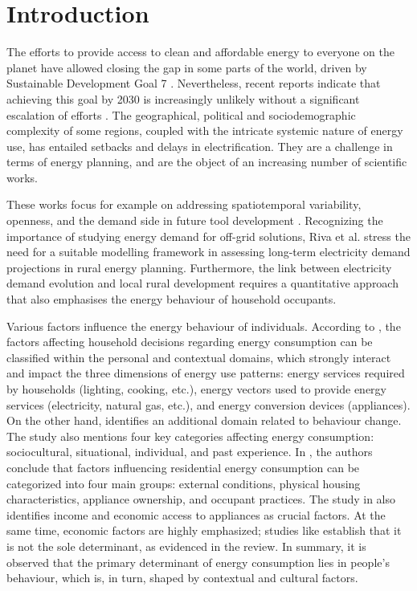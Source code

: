 \documentclass[final,3p,times,onecolumn]{elsarticle}
\begin{document}

\section{Introduction}
\label{sec:sample1}

The efforts to provide access to clean and affordable energy to everyone on the planet have allowed closing the gap in some parts of the world, driven by Sustainable Development Goal 7 \cite{un_news_centre_transforming_2015}. Nevertheless, recent reports indicate that achieving this goal by 2030 is increasingly unlikely without a significant escalation of efforts \cite{iea_irena_unsd_wb_who_tracking_2023}.  The geographical, political and sociodemographic complexity of some regions, coupled with the intricate systemic nature of energy use, has entailed setbacks and delays in electrification. They are a challenge in terms of energy planning, and are the object of an increasing number of scientific works.

These works focus for example on addressing spatiotemporal variability, openness, and the demand side in future tool development \cite{ringkjob_review_2018}. Recognizing the importance of studying energy demand for off-grid solutions, Riva et al. \cite{riva_modelling_nodate} stress the need for a suitable modelling framework in assessing long-term electricity demand projections in rural energy planning. Furthermore, the link between electricity demand evolution and local rural development requires a quantitative approach \cite{ringkjob_review_2018} that also emphasises the energy behaviour of household occupants\cite{zou_mixed_2018}. 
    
Various factors influence the energy behaviour of individuals. According to \cite{Kowsari2011}, the factors affecting household decisions regarding energy consumption can be classified within the personal and contextual domains, which strongly interact and impact the three dimensions of energy use patterns: energy services required by households (lighting, cooking, etc.), energy vectors used to provide energy services (electricity, natural gas, etc.), and energy conversion devices (appliances). On the other hand, \cite{medojevic_integrated_2021} identifies an additional domain related to behaviour change. The study also mentions four key categories affecting energy consumption: sociocultural, situational, individual, and past experience. In \cite{kavousian_determinants_2013}, the authors conclude that factors influencing residential energy consumption can be categorized into four main groups: external conditions, physical housing characteristics, appliance ownership, and occupant practices. The study in \cite{tam_energy-related_2018} also identifies income and economic access to appliances as crucial factors. At the same time, economic factors are highly emphasized; studies like \cite{tesfamichael_eager_2020} establish that it is not the sole determinant, as evidenced in the review. In summary, it is observed that the primary determinant of energy consumption lies in people's behaviour, which is, in turn, shaped by contextual and cultural factors. 
\end{document}
